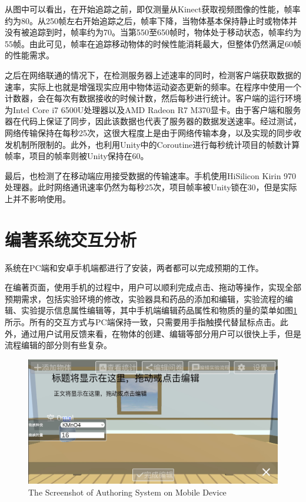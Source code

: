 从图中可以看出，在开始追踪之前，即仅测量从Kinect获取视频图像的性能，帧率约为80。从250帧左右开始追踪之后，帧率下降，当物体基本保持静止时或物体并没有被追踪到时，帧率约为70。当第550至650帧时，物体处于移动状态，帧率约为55帧。由此可见，帧率在追踪移动物体的时候性能消耗最大，但整体仍然满足60帧的性能需求。

之后在网络联通的情况下，在检测服务器上述速率的同时，检测客户端获取数据的速率，实际上也就是增强现实应用中物体运动姿态更新的频率。在程序中使用一个计数器，会在每次有数据接收的时候计数，然后每秒进行统计。客户端的运行环境为Intel Core i7 6500U处理器以及AMD Radeon R7 M370显卡。由于客户端和服务器在代码上保证了同步，因此该数据也代表了服务器的数据发送速率。经过测试，网络传输保持在每秒25次，这很大程度上是由于网络传输本身，以及实现的同步收发机制所限制的。此外，也利用Unity中的Coroutine进行每秒统计项目的帧数计算帧率，项目的帧率则被Unity保持在60。

最后，也检测了在移动端应用接受数据的传输速率。手机使用HiSilicon Kirin 970处理器。此时网络通讯速率仍然为每秒25次，项目帧率被Unity锁在30，但是实际上并不影响使用。

\section{编著系统交互分析}
系统在PC端和安卓手机端都进行了安装，两者都可以完成预期的工作。

在编著页面，使用手机的过程中，用户可以顺利完成点击、拖动等操作，实现全部预期需求，包括实验环境的修改，实验器具和药品的添加和编辑，实验流程的编辑、实验提示信息属性编辑等，其中手机端编辑药品属性和物质的量的菜单如图\ref{fig:mEdit}所示。所有的交互方式与PC端保持一致，只需要用手指触摸代替鼠标点击。此外，通过用户试用反馈来看，在物体的创建、编辑等部分用户可以很快上手，但是流程编辑的部分则有些复杂。

\begin{figure}[!htp]
  \centering
  \includegraphics[width=12cm]{figure/mobileEdit.jpg}
    {The Screenshot of Authoring System on Mobile Device}
 \label{fig:mEdit}
\end{figure}

